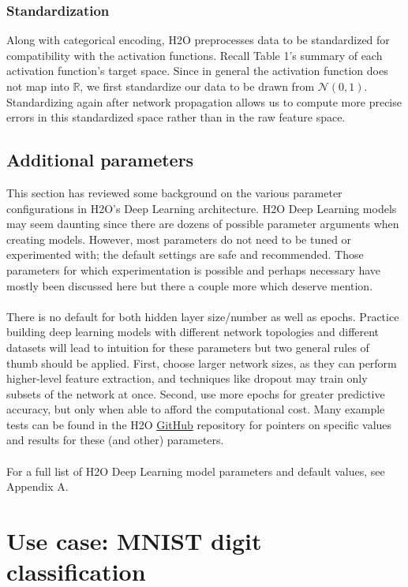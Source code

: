 \documentclass[11pt]{article}
\begin{document}
\subsubsection{Standardization} \label{2.5.1}

Along with categorical encoding, H2O preprocesses data to be standardized for compatibility with the activation functions. Recall Table 1's summary of each activation function's target space. Since in general the activation function does not map into $\mathbb{R}$, we first standardize our data to be drawn from $\mathcal{N}(0,1)$. Standardizing again after network propagation allows us to compute more precise errors in this standardized space rather than in the raw feature space. 

\subsection{Additional parameters} \label{2.6}

This section has reviewed some background on the various parameter configurations in H2O's Deep Learning architecture. H2O Deep Learning models may seem daunting since there are dozens of possible parameter arguments when creating models. However, most parameters do not need to be tuned or experimented with; the default settings are safe and recommended. Those parameters for which experimentation is possible and perhaps necessary have mostly been discussed here but there a couple more which deserve mention.
\\
\\
There is no default for both hidden layer size/number as well as epochs. Practice building deep learning models with different network topologies and different datasets will lead to intuition for these parameters but two general rules of thumb should be applied. First, choose larger network sizes, as they can perform higher-level feature extraction, and techniques like dropout may train only subsets of the network at once. Second, use more epochs for greater predictive accuracy, but only when able to afford the computational cost. Many example tests can be found in the H2O \href{https://github.com/h2oai/h2o/}{GitHub} repository for pointers on specific values and results for these (and other) parameters.
\\
\\
For a full list of H2O Deep Learning model parameters and default values, see Appendix A. 

\section{Use case: MNIST digit classification} \label{3}
\end{document}
